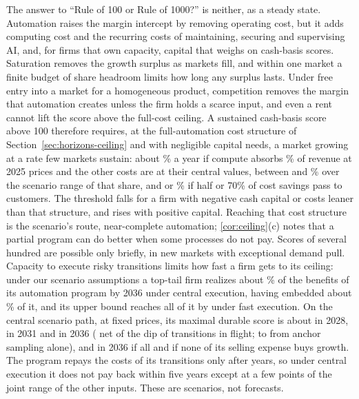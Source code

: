 The answer to ``Rule of 100 or Rule of 1000?'' is neither, as a steady state. Automation raises the margin intercept by removing operating cost, but it adds computing cost and the recurring costs of maintaining, securing and supervising AI, and, for firms that own capacity, capital that weighs on cash-basis scores. Saturation removes the growth surplus as markets fill, and within one market a finite budget of share headroom limits how long any surplus lasts. Under free entry into a market for a homogeneous product, competition removes the margin that automation creates unless the firm holds a scarce input, and even a rent cannot lift the score above the full-cost ceiling. A sustained cash-basis score above 100 therefore requires, at the full-automation cost structure of Section~\ref{sec:horizons-ceiling} and with negligible capital needs, a market growing at a rate few markets sustain: about \GstarCenOne\% a year if compute absorbs \CcCen\% of revenue at 2025 prices and the other costs are at their central values, between \GstarCcLo{} and \GstarCcHi\% over the scenario range of that share, and \GstarPhiHalfOne{} or \GstarPhiSevenOne\% if half or 70\% of cost savings pass to customers. The threshold falls for a firm with negative cash capital or costs leaner than that structure, and rises with positive capital. Reaching that cost structure is the scenario's route, near-complete automation; \autoref{cor:ceiling}(c) notes that a partial program can do better when some processes do not pay. Scores of several hundred are possible only briefly, in new markets with exceptional demand pull. Capacity to execute risky transitions limits how fast a firm gets to its ceiling: under our scenario assumptions a top-tail firm realizes about \PaceCenSix\% of the benefits of its automation program by 2036 under central execution, having embedded about \CenEmbSix\% of it, and its upper bound reaches all of it by \PaceFastDone{} under fast execution. On the central scenario path, at fixed prices, its maximal durable score is about \CenREight{} in 2028, \CenROne{} in 2031 and \CenRSix{} in 2036 (\CenRSixNet{} net of the dip of transitions in flight; \CenRSixLo{} to \CenRSixHi{} from anchor sampling alone), and in 2036 \CenRSixAllSM{} if all and \CenRSixNoSM{} if none of its selling expense buys growth. The program repays the costs of its transitions only after \PayBackCen{} years, so under central execution it does not pay back within five years except at a few points of the joint range of the other inputs. These are scenarios, not forecasts.

